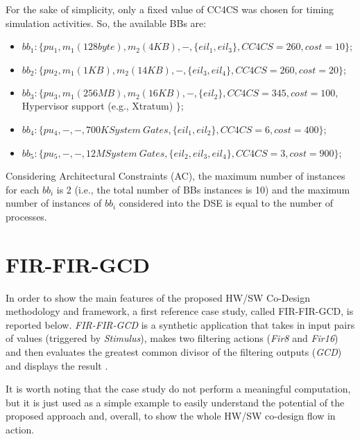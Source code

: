 %
For the sake of simplicity, only a fixed value of CC4CS was chosen for timing simulation activities. So, the available BBs are: 
%
\begin{itemize}
    \item ${bb}_1: \{ pu_1, m_1 (128 byte), m_2 (4KB), - , \{eil_1, eil_3\}, CC4CS = 260, cost = 10 \}$;
    \item  ${bb}_2: \{ pu_2, m_1 (1KB), m_2 (14KB), - , \{eil_3, eil_4\}, CC4CS = 260, cost = 20 \}$;
    \item  ${bb}_3: \{ pu_3, m_1 (256MB), m_2 (16KB), - , \{eil_2\}, CC4CS = 345, cost = 100,$  Hypervisor support (e.g., Xtratum) $\}$; 
    \item  ${bb}_4: \{ pu_4, - , - , 700K System \ Gates, \{eil_1, eil_2\}, CC4CS = 6, cost = 400 \}$; 
    \item ${bb}_5: \{ pu_5, - , - , 12M System \ Gates, \{eil_2, eil_3, eil_4\}, CC4CS = 3, cost = 900 \}$; 
\end{itemize}
%
Considering Architectural Constraints (AC), the maximum number of instances for each $bb_i$ is 2 (i.e., the total number of BBs instances is 10) and the maximum number of instances of $bb_i$ considered into the DSE is equal to the number of processes. 
%
\section{FIR-FIR-GCD}\label{firfirgcd_base}
%
In order to show the main features of the proposed HW/SW Co-Design methodology and framework, a first reference case study, called FIR-FIR-GCD, is reported below. \textit{FIR-FIR-GCD} is a synthetic application that takes in input pairs of values (triggered by \textit{Stimulus}), makes two filtering actions (\textit{Fir8} and \textit{Fir16}) and then evaluates the greatest common divisor of the filtering outputs (\textit{GCD}) and displays the result \cite{bib34}. \par
It is worth noting that the case study do not perform a meaningful computation, but it is just used as a simple example to easily understand the potential of the proposed approach and, overall, to show the whole HW/SW co-design flow in action. 
%
